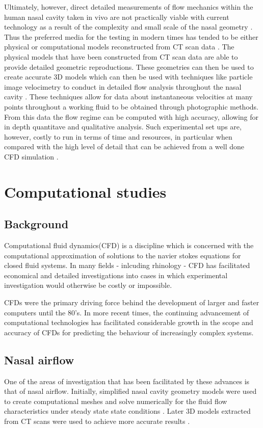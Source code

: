Ultimately, however, direct detailed measurements of flow mechanics within the human nasal cavity taken in vivo are not practically viable with current technology as a result of the complexity and small scale of the nasal geometry \cite{Doorly2008c}. Thus the preferred media for the testing in modern times has tended to be either physical or computational models reconstructed from CT scan data \cite{Doorly2008c}. The physical models that have been constructed from CT scan data are able to provide detailed geometric reproductions.
These geometries can then be used to create accurate 3D models which can then be used with techniques like particle image velocimetry to conduct in detailed flow analysis throughout the nasal cavity \cite{Chung2008, Kelly2000}.
These techniques allow for data about instantaneous velocities at many points throughout a working fluid to be obtained through photographic methods. From this data the flow regime can be computed with high accuracy, allowing for in depth quantitave and qualitative analysis.
Such experimental set ups are, however, costly to run in terms of time and resources, in particular when compared with the high level of detail that can be achieved from a well done CFD simulation \cite{Ma2009}.


\section{Computational studies}  
\subsection*{Background}
Computational fluid dynamics(CFD) is a discipline which is concerned with the computational approximation of solutions to the navier stokes equations for closed fluid systems\cite{Tu2008}. In many fields - inlcuding rhinology - CFD has facilitated economical and detailed investigations into cases in which experimental investigation would otherwise be costly or impossible\cite{Keyhani1995}.

CFDs were the primary driving force behind the development of larger and faster computers until the 80's\cite{Wendt2009}. In more recent times, the continuing advancement of computational technologies has facilitated considerable growth in the scope and accuracy of CFDs for predicting the behaviour of increasingly complex systems\cite{Tu2008}. 


\subsection*{Nasal airflow}
One of the areas of investigation that has been facilitated by these advances is that of nasal airflow. Initially, simplified nasal cavity geometry models were used to create computational meshes and solve numerically for the fluid flow characteristics under steady state state conditions \cite{Keyhani1995, Hahn1993}. Later 3D models extracted from CT scans were used to achieve more accurate results \cite{Martonen2002}. 


